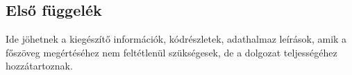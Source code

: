 \appendix
\chapter*{\fuggelek}
\setcounter{chapter}{\appendixletter} %

\section{Első függelék}

Ide jöhetnek a kiegészítő információk, kódrészletek, adathalmaz leírások, amik a főszöveg megértéséhez nem feltétlenül szükségesek, de a dolgozat teljességéhez hozzátartoznak.
